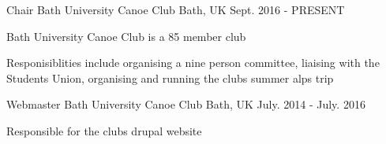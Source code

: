 


\begin{cventries}


\cventry
{Chair} %
{Bath University Canoe Club} %
{Bath, UK} %
{Sept. 2016 - PRESENT} %
{ %
\begin{cvitems}
\item {Bath University Canoe Club is a 85 member club}
\item {Responisiblities include organising a nine person committee, liaising with the Students Union, organising and running the clubs summer alps trip}
\end{cvitems}
}


\cventry
{Webmaster} %
{Bath University Canoe Club} %
{Bath, UK} %
{July. 2014 - July. 2016} %
{ %
\begin{cvitems}
\item {Responsible for the clubs drupal website}
\end{cvitems}
}



\end{cventries}